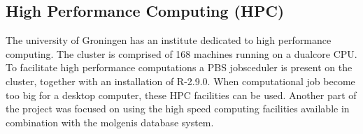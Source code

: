 \subsection{High Performance Computing (HPC)}
The university of Groningen has an institute dedicated to high performance computing. The cluster is comprised of 168 machines running on a dualcore CPU. To 
facilitate high performance computations a PBS\cite{PBS2000} jobsceduler is present on the cluster, together with an installation of R-2.9.0. When computational job become too big for a desktop computer, these HPC facilities can be used. 
Another part of the project was focused on using the high speed computing facilities available in combination with the molgenis database system. 